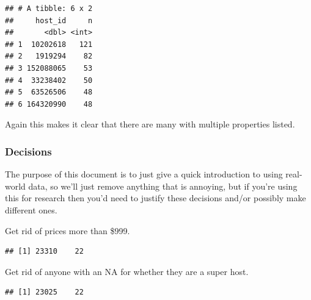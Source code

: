 \documentclass[
]{book}
\newenvironment{Shaded}{\begin{snugshade}}{\end{snugshade}}
\newcommand{\CommentTok}[1]{\textcolor[rgb]{0.56,0.35,0.01}{\textit{#1}}}
\newcommand{\DecValTok}[1]{\textcolor[rgb]{0.00,0.00,0.81}{#1}}
\newcommand{\KeywordTok}[1]{\textcolor[rgb]{0.13,0.29,0.53}{\textbf{#1}}}
\newcommand{\NormalTok}[1]{#1}
\newcommand{\OperatorTok}[1]{\textcolor[rgb]{0.81,0.36,0.00}{\textbf{#1}}}
\newcommand{\StringTok}[1]{\textcolor[rgb]{0.31,0.60,0.02}{#1}}
\begin{document}
\begin{verbatim}
## # A tibble: 6 x 2
##     host_id     n
##       <dbl> <int>
## 1  10202618   121
## 2   1919294    82
## 3 152088065    53
## 4  33238402    50
## 5  63526506    48
## 6 164320990    48
\end{verbatim}

Again this makes it clear that there are many with multiple properties listed.

\hypertarget{decisions}{%
\subsubsection{Decisions}\label{decisions}}

The purpose of this document is to just give a quick introduction to using real-world data, so we'll just remove anything that is annoying, but if you're using this for research then you'd need to justify these decisions and/or possibly make different ones.

Get rid of prices more than \$999.

\begin{Shaded}
\end{Shaded}

\begin{verbatim}
## [1] 23310    22
\end{verbatim}

Get rid of anyone with an NA for whether they are a super host.

\begin{Shaded}
\end{Shaded}

\begin{verbatim}
## [1] 23025    22
\end{verbatim}
\end{document}
